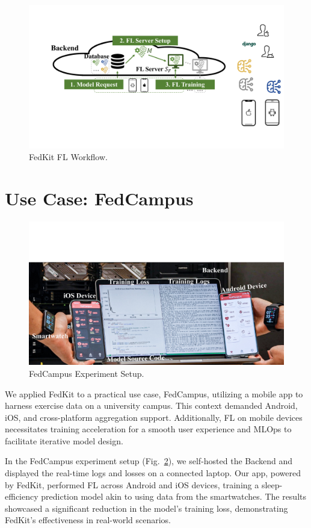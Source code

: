 \documentclass[conference]{IEEEtran}
\begin{document}
\begin{figure}
    \centering
    \includegraphics*[width=0.9\linewidth]{fl_workflow.pdf}
    \caption{FedKit FL Workflow.}
    \label{fig:fl-workflow}
\end{figure}

\section{Use Case: FedCampus}

\begin{figure}
    \centering
    \includegraphics*[width=0.9\linewidth]{fedcampus.pdf}
    \caption{FedCampus Experiment Setup.}
    \label{fig:fedcampus}
\end{figure}

We applied FedKit to a practical use case, FedCampus,
utilizing a mobile app to harness exercise data on a university campus.
This context demanded Android, iOS, and cross-platform aggregation support.
Additionally,
FL on mobile devices necessitates training acceleration for
a smooth user experience
and MLOps to facilitate iterative model design.

In the FedCampus experiment setup (Fig.~\ref{fig:fedcampus}),
we self-hosted the Backend
and displayed the real-time logs and losses on a connected laptop.
Our app, powered by FedKit,
performed FL across Android and iOS devices,
training a sleep-efficiency prediction model
akin to \cite{khoa2022fedmcrnn}
using data from the smartwatches.
The results showcased a significant reduction in the model's training loss,
demonstrating FedKit's effectiveness in real-world scenarios.




\vspace{12pt}
\color{red}
\end{document}
